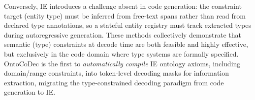 Conversely, IE introduces a challenge absent in code generation: the constraint target (entity type) must be inferred from free-text spans rather than read from declared type annotations, so a stateful entity registry must track extracted types during autoregressive generation.
These methods collectively demonstrate that semantic (type) constraints at decode time are both feasible and highly effective, but exclusively in the code domain where type systems are formally specified.
OntoCoDec is the first to \emph{automatically compile} IE ontology axioms, including domain/range constraints, into token-level decoding masks for information extraction, migrating the type-constrained decoding paradigm from code generation to IE.

